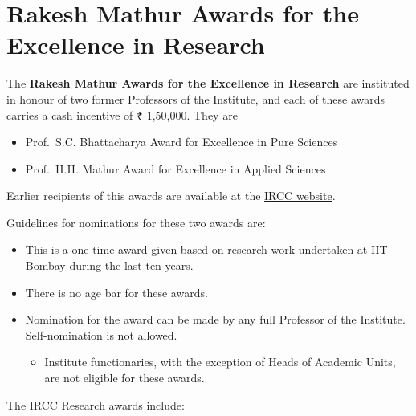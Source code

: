 \documentclass[
  10pt,
  a5paper,
  10pt,
  openany]{amsbook}
\providecommand{\tightlist}{%
  \setlength{\itemsep}{0pt}\setlength{\parskip}{0pt}}
\begin{document}
\section{Rakesh Mathur Awards for the Excellence in
Research}\label{rakesh-mathur-awards-for-the-excellence-in-research}

The \textbf{Rakesh Mathur Awards for the Excellence in Research} are
instituted in honour of two former Professors of the Institute, and each
of these awards carries a cash incentive of ₹ 1,50,000. They are

\begin{itemize}
\tightlist
\item
  Prof.~S.C. Bhattacharya Award for Excellence in Pure Sciences
\item
  Prof.~H.H. Mathur Award for Excellence in Applied Sciences
\end{itemize}

Earlier recipients of this awards are available at the
\href{http://www.ircc.iitb.ac.in/IRCC-Webpage/rnd/ResearchAwards.jsp?AwardType=NationalInstituteIITB}{IRCC
website}.

Guidelines for nominations for these two awards are:

\begin{itemize}
\tightlist
\item
  This is a one-time award given based on research work undertaken at
  IIT Bombay during the last ten years.
\item
  There is no age bar for these awards.
\item
  Nomination for the award can be made by any full Professor of the
  Institute. Self-nomination is not allowed.

  \begin{itemize}
  \tightlist
  \item
    Institute functionaries, with the exception of Heads of Academic
    Units, are not eligible for these awards.
  \end{itemize}
\end{itemize}

The IRCC Research awards include:
\end{document}
